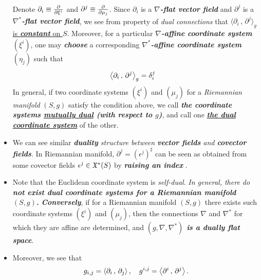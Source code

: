 \documentclass[11pt]{article}
\begin{document}
\begin{itemize}
\begin{definition}
Denote $\partial_i \equiv \frac{\partial }{ \partial \xi^i}$ and $\partial^j \equiv \frac{\partial }{ \partial \mu_j}$. Since $\partial_i$ is a \emph{\textbf{$\nabla$-flat vector field}} and $\partial^j$ is a \emph{\textbf{$\nabla^*$-flat vector field}}, we see from property of \emph{dual connections} that \underline{$\langle\partial_i \,,\,\partial^j\rangle_{g}$  is \emph{\textbf{constant}} on $S$}. Moreover, for a particular \emph{\textbf{$\nabla$-affine coordinate system}} $(\xi^i)$, one may \emph{\textbf{choose}} a corresponding \emph{\textbf{$\nabla^*$-affine coordinate system $(\eta_j)$}}
such that 
\begin{align}
\left\langle \partial_i\,,\, \partial^j \right\rangle_{g} &= \delta_{i}^{j}\label{eqn: dual_coordinate_system}
\end{align} In general, if two coordinate systems $(\xi^i)$ and $(\mu_j)$ for a \emph{Riemannian manifold} $(S, g)$ satisfy the condition above, we call \emph{\textbf{the coordinate systems \underline{mutually dual} (with respect to $g$)}}, and call one \underline{\emph{\textbf{the dual coordinate system}}} of the other. 
\end{definition}

\item \begin{remark}
We can see similar \emph{\textbf{duality} structure between  \textbf{vector fields} and \textbf{covector fields}}. In Riemannian manifold, $\partial^j = (\epsilon^j)^{\sharp}$ can be seen as obtained from some covector fields $\epsilon^j \in {\mathfrak X}^{*}(S)$ by \emph{\textbf{raising an index}} \citep{lee2018introduction}.
\end{remark}

\item Note that the Euclidean coordinate system is \emph{self-dual}. \emph{In general, there do \textbf{not exist dual coordinate systems for a
Riemannian manifold $(S, g)$.}} \emph{\textbf{Conversely}}, if for a Riemannian manifold $(S,g)$ there exists such coordinate systems $(\xi^i)$ and $(\mu_j)$, then the connections $\nabla$ and $\nabla^{*}$ for which they are affine are determined, and \emph{\textbf{$(g, \nabla, \nabla^{*})$ is a dually flat space}}.

\item Moreover, we see that
\begin{align}
g_{i,j} = \left\langle \partial_i\,,\, \partial_j \right\rangle, \quad g^{i,j} =  \left\langle \partial^i\,,\, \partial^j \right\rangle.  \label{eqn: vector_fields_dual_coordinate_system}
\end{align}


\end{itemize}
\end{document}
